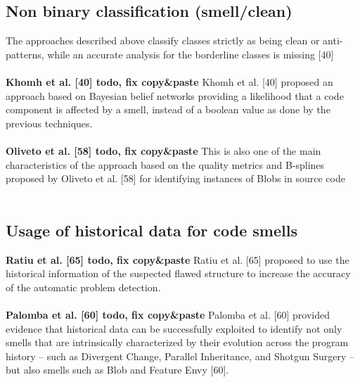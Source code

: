 \subsection{Non binary classification (smell/clean)}
The approaches described above classify classes strictly as being clean or anti-patterns, while an accurate analysis for the borderline classes is missing [40] 
\\
\\
\textbf{Khomh et al. [40] todo, fix copy\&paste }
Khomh et al. [40] proposed an approach based on Bayesian belief networks providing a likelihood that a code component is affected by a smell, instead of a boolean value as done by the previous techniques.
\\
\\
\textbf{Oliveto et al. [58] todo, fix copy\&paste }
This is also one of the main characteristics of the approach based on the quality metrics and B-splines proposed by Oliveto et al. [58] for identifying instances of Blobs in source code
\\
\\
\subsection{Usage of historical data for code smells}
\textbf{Ratiu et al. [65] todo, fix copy\&paste }
Ratiu et al. [65] proposed to use the historical information of the suspected flawed structure to increase the accuracy of the automatic problem detection.
\\
\\
\textbf{Palomba et al. [60] todo, fix copy\&paste }
Palomba et al. [60] provided evidence that historical data can be successfully exploited to identify not only smells that are intrinsically characterized by their evolution across the program history – such as Divergent Change, Parallel Inheritance, and Shotgun Surgery – but also smells such as Blob and Feature Envy [60].
\\
\\